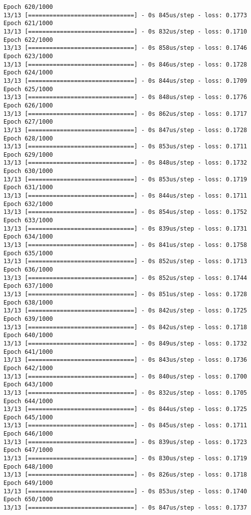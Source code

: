 \documentclass[11pt]{article}
\begin{document}
\begin{Verbatim}[commandchars=\\\{\}]
Epoch 620/1000
13/13 [==============================] - 0s 845us/step - loss: 0.1773
Epoch 621/1000
13/13 [==============================] - 0s 832us/step - loss: 0.1710
Epoch 622/1000
13/13 [==============================] - 0s 858us/step - loss: 0.1746
Epoch 623/1000
13/13 [==============================] - 0s 846us/step - loss: 0.1728
Epoch 624/1000
13/13 [==============================] - 0s 844us/step - loss: 0.1709
Epoch 625/1000
13/13 [==============================] - 0s 848us/step - loss: 0.1776
Epoch 626/1000
13/13 [==============================] - 0s 862us/step - loss: 0.1717
Epoch 627/1000
13/13 [==============================] - 0s 847us/step - loss: 0.1728
Epoch 628/1000
13/13 [==============================] - 0s 853us/step - loss: 0.1711
Epoch 629/1000
13/13 [==============================] - 0s 848us/step - loss: 0.1732
Epoch 630/1000
13/13 [==============================] - 0s 853us/step - loss: 0.1719
Epoch 631/1000
13/13 [==============================] - 0s 844us/step - loss: 0.1711
Epoch 632/1000
13/13 [==============================] - 0s 854us/step - loss: 0.1752
Epoch 633/1000
13/13 [==============================] - 0s 839us/step - loss: 0.1731
Epoch 634/1000
13/13 [==============================] - 0s 841us/step - loss: 0.1758
Epoch 635/1000
13/13 [==============================] - 0s 852us/step - loss: 0.1713
Epoch 636/1000
13/13 [==============================] - 0s 852us/step - loss: 0.1744
Epoch 637/1000
13/13 [==============================] - 0s 851us/step - loss: 0.1728
Epoch 638/1000
13/13 [==============================] - 0s 842us/step - loss: 0.1725
Epoch 639/1000
13/13 [==============================] - 0s 842us/step - loss: 0.1718
Epoch 640/1000
13/13 [==============================] - 0s 849us/step - loss: 0.1732
Epoch 641/1000
13/13 [==============================] - 0s 843us/step - loss: 0.1736
Epoch 642/1000
13/13 [==============================] - 0s 840us/step - loss: 0.1700
Epoch 643/1000
13/13 [==============================] - 0s 832us/step - loss: 0.1705
Epoch 644/1000
13/13 [==============================] - 0s 844us/step - loss: 0.1725
Epoch 645/1000
13/13 [==============================] - 0s 845us/step - loss: 0.1711
Epoch 646/1000
13/13 [==============================] - 0s 839us/step - loss: 0.1723
Epoch 647/1000
13/13 [==============================] - 0s 830us/step - loss: 0.1719
Epoch 648/1000
13/13 [==============================] - 0s 826us/step - loss: 0.1718
Epoch 649/1000
13/13 [==============================] - 0s 853us/step - loss: 0.1740
Epoch 650/1000
13/13 [==============================] - 0s 847us/step - loss: 0.1737

\end{Verbatim}
\end{document}
